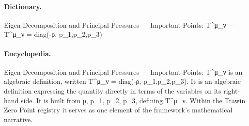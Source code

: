 \paragraph{Dictionary.}
Eigen-Decomposition and Principal Pressures — Important Points: T\textasciicircum{}μ\_ν — T\textasciicircum{}μ\_ν = diag(-ρ, p\_1,p\_2,p\_3)

\paragraph{Encyclopedia.}
Eigen-Decomposition and Principal Pressures — Important Points: T\textasciicircum{}μ\_ν is an algebraic definition, written T\textasciicircum{}μ\_ν = diag(-ρ, p\_1,p\_2,p\_3). It is an algebraic definition expressing the quantity directly in terms of the variables on its right-hand side. It is built from ρ, p\_1, p\_2, p\_3, defining T\textasciicircum{}μ\_ν. Within the Trawin Zero Point registry it serves as one element of the framework's mathematical narrative.
